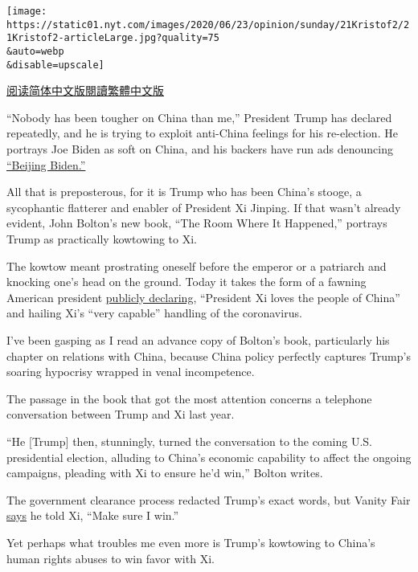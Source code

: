 \texttt{[image: https://static01.nyt.com/images/2020/06/23/opinion/sunday/21Kristof2/21Kristof2-articleLarge.jpg?quality=75\\\&auto=webp\\\&disable=upscale]}

\href{https://cn.nytimes.com/opinion/20200623/trump-china-john-bolton-book/}{阅读简体中文版}\href{https://cn.nytimes.com/opinion/20200623/trump-china-john-bolton-book/zh-hant/}{閱讀繁體中文版}

``Nobody has been tougher on China than me,'' President Trump has
declared repeatedly, and he is trying to exploit anti-China feelings for
his re-election. He portrays Joe Biden as soft on China, and his backers
have run ads denouncing
\href{https://thehill.com/homenews/campaign/495649-pro-trump-group-releases-another-round-of-beijing-biden-ads-in-battleground}{``Beijing
Biden.''}

All that is preposterous, for it is Trump who has been China's stooge, a
sycophantic flatterer and enabler of President Xi Jinping. If that
wasn't already evident, John Bolton's new book, ``The Room Where It
Happened,'' portrays Trump as practically kowtowing to Xi.

The kowtow meant prostrating oneself before the emperor or a patriarch
and knocking one's head on the ground. Today it takes the form of a
fawning American president
\href{https://www.cnn.com/2020/04/21/politics/trump-china-praise-coronavirus-timeline/index.html}{publicly
declaring}, ``President Xi loves the people of China'' and hailing Xi's
``very capable'' handling of the coronavirus.

I've been gasping as I read an advance copy of Bolton's book,
particularly his chapter on relations with China, because China policy
perfectly captures Trump's soaring hypocrisy wrapped in venal
incompetence.

The passage in the book that got the most attention concerns a telephone
conversation between Trump and Xi last year.

``He {[}Trump{]} then, stunningly, turned the conversation to the coming
U.S. presidential election, alluding to China's economic capability to
affect the ongoing campaigns, pleading with Xi to ensure he'd win,''
Bolton writes.

The government clearance process redacted Trump's exact words, but
Vanity Fair
\href{https://www.vanityfair.com/news/2020/06/boltons-unredacted-book-shows-trump-trying-to-hide}{says}
he told Xi, ``Make sure I win.''

Yet perhaps what troubles me even more is Trump's kowtowing to China's
human rights abuses to win favor with Xi.

